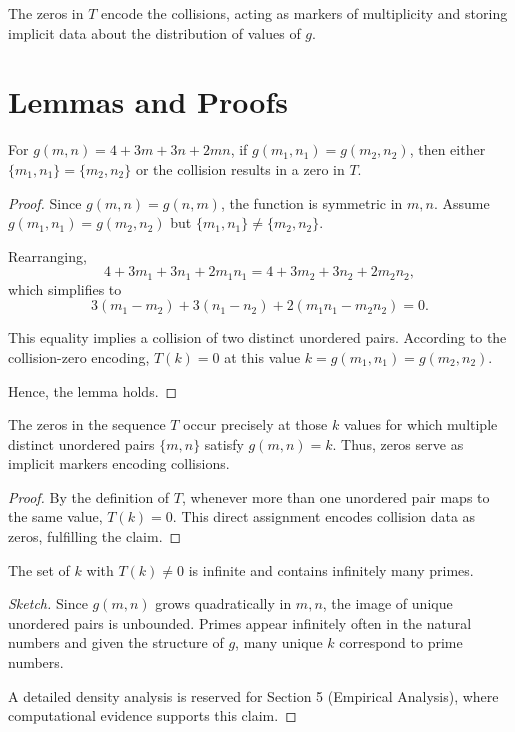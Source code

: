 \documentclass[12pt]{article}
\begin{document}
\begin{remark}
The zeros in \(T\) encode the collisions, acting as markers of multiplicity and storing implicit data about the distribution of values of \(g\).
\end{remark}
\section{Lemmas and Proofs}

\begin{lemma}
For \(g(m,n) = 4 + 3m + 3n + 2mn\), if \(g(m_1,n_1) = g(m_2,n_2)\), then either \(\{m_1,n_1\} = \{m_2,n_2\}\) or the collision results in a zero in \(T\).
\end{lemma}

\begin{proof}
Since \(g(m,n) = g(n,m)\), the function is symmetric in \(m,n\). Assume \(g(m_1,n_1) = g(m_2,n_2)\) but \(\{m_1,n_1\} \neq \{m_2,n_2\}\).

Rearranging,
\[
4 + 3m_1 + 3n_1 + 2m_1 n_1 = 4 + 3m_2 + 3n_2 + 2m_2 n_2,
\]
which simplifies to
\[
3(m_1 - m_2) + 3(n_1 - n_2) + 2(m_1 n_1 - m_2 n_2) = 0.
\]

This equality implies a collision of two distinct unordered pairs. According to the collision-zero encoding, \(T(k) = 0\) at this value \(k = g(m_1,n_1) = g(m_2,n_2)\).

Hence, the lemma holds.
\end{proof}

\begin{lemma}
The zeros in the sequence \(T\) occur precisely at those \(k\) values for which multiple distinct unordered pairs \(\{m,n\}\) satisfy \(g(m,n) = k\). Thus, zeros serve as implicit markers encoding collisions.
\end{lemma}

\begin{proof}
By the definition of \(T\), whenever more than one unordered pair maps to the same value, \(T(k) = 0\). This direct assignment encodes collision data as zeros, fulfilling the claim.
\end{proof}

\begin{lemma}
The set of \(k\) with \(T(k) \neq 0\) is infinite and contains infinitely many primes.
\end{lemma}

\begin{proof}[Sketch]
Since \(g(m,n)\) grows quadratically in \(m,n\), the image of unique unordered pairs is unbounded. Primes appear infinitely often in the natural numbers and given the structure of \(g\), many unique \(k\) correspond to prime numbers.

A detailed density analysis is reserved for Section 5 (Empirical Analysis), where computational evidence supports this claim.
\end{proof}
\end{document}
